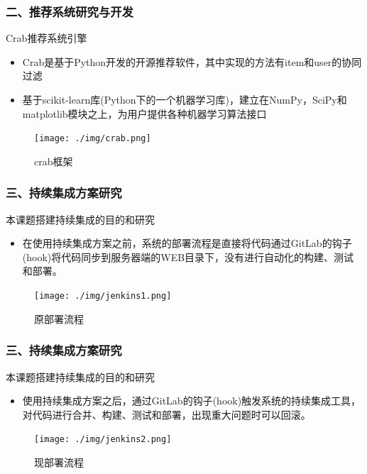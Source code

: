 \documentclass{beamer}
\begin{document}
\begin{frame}
\frametitle{二、推荐系统研究与开发}
  \begin{block}{Crab推荐系统引擎}
    \begin{itemize}
      \item Crab是基于Python开发的开源推荐软件，其中实现的方法有item和user的协同过滤
      \item 基于scikit-learn库(Python下的一个机器学习库)，建立在NumPy，SciPy和matplotlib模块之上，为用户提供各种机器学习算法接口
    \end{itemize}
  \end{block}
  \begin{figure}
    \centering
      \texttt{[image: ./img/crab.png]}
    \caption{crab框架}
    \label{fig:visual}
  \end{figure}
\end{frame}

\begin{frame}
\frametitle{三、持续集成方案研究}
  \begin{block}{本课题搭建持续集成的目的和研究}
    \begin{itemize}
      \item 在使用持续集成方案之前，系统的部署流程是直接将代码通过GitLab的钩子(hook)将代码同步到服务器端的WEB目录下，没有进行自动化的构建、测试和部署。
    \end{itemize} 
  \end{block}
  \begin{figure}
    \centering
      \texttt{[image: ./img/jenkins1.png]}
    \caption{原部署流程}
    \label{fig:visual}
  \end{figure}
\end{frame}

\begin{frame}
\frametitle{三、持续集成方案研究}
  \begin{block}{本课题搭建持续集成的目的和研究}
    \begin{itemize}
      \item 使用持续集成方案之后，通过GitLab的钩子(hook)触发系统的持续集成工具，对代码进行合并、构建、测试和部署，出现重大问题时可以回滚。
    \end{itemize}
  \end{block}
  \begin{figure}
    \centering
      \texttt{[image: ./img/jenkins2.png]}
    \caption{现部署流程}
    \label{fig:visual}
  \end{figure}
\end{frame}
\end{document}
